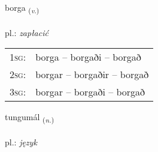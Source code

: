 \documentclass[frontgrid, backgrid]{flacards}\usepackage[]{graphicx}\usepackage[]{xcolor}
\begin{document}
\renewcommand{\flhead}{\vskip5pt \fboxsep=0pt {\small\bfseries\footnotesize Sagnorð | czasownik}}
\renewcommand{\fcfoot}{\vskip5pt \fboxsep=0pt \hspace{2pt}{\small\bfseries\footnotesize 1K}}

\renewcommand{\blhead}{\vskip5pt {\small\bfseries\footnotesize Sagnorð | czasownik }}
\renewcommand{\bcfoot}{\vskip5pt \hspace{2pt}{\small\bfseries\footnotesize 1K}}


{borga \small{\textsubscript{(\textit{v.})}} \\[1ex] %
\textphonetic{[pɔrka]} \\
pl.: \emph{zapłacić} \\  [2ex]
\renewcommand*{\arraystretch}{0.8}
\begin{tabular}{p{1cm}l}
\textsc{1sg}: & borga -- borgaði -- borgað \\ 
\textsc{2sg}: & borgar -- borgaðir -- borgað \\ 
\textsc{3sg}: & borgar -- borgaði -- borgað \\ 
\end{tabular}
}

\renewcommand{\flhead}{\vskip5pt \fboxsep=0pt {\small\bfseries\footnotesize Nafnorð | rzeczownik}}
\renewcommand{\fcfoot}{\vskip5pt \fboxsep=0pt \hspace{2pt}{\small\bfseries\footnotesize 1K}}

\renewcommand{\blhead}{\vskip5pt {\small\bfseries\footnotesize Nafnorð | rzeczownik }}
\renewcommand{\bcfoot}{\vskip5pt \hspace{2pt}{\small\bfseries\footnotesize 1K}}


{tungumál \small{\textsubscript{(\textit{n.})}} \\[1ex] %
\textphonetic{[tʰuŋkʏmaul]} \\
pl.: \emph{język} \\  [2ex]
\renewcommand*{\arraystretch}{0.8}
}
\end{document}
